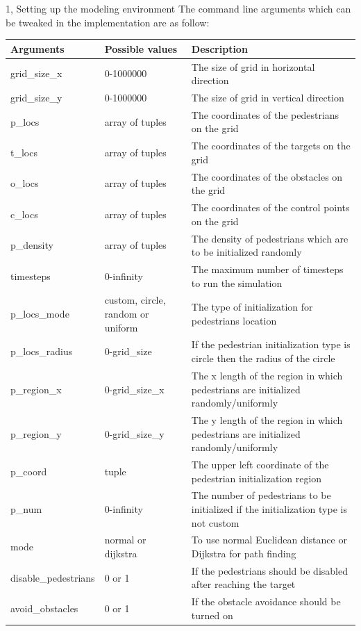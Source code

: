 \documentclass[10pt,a4paper]{article}
\begin{document}
\begin{task}{1, Setting up the modeling environment}
The command line arguments which can be tweaked in the implementation are as follow:
\begin{center}
\begin{tabular}{ | m{3cm} | m{3cm}| m{7cm} | } 
\hline
Arguments & Possible values & Description \\ 
\hline\hline
grid\_size\_x & 0-1000000 & The size of grid in horizontal direction \\ 
\hline
grid\_size\_y & 0-1000000 & The size of grid in vertical direction \\ 
\hline
p\_locs & array of tuples & The coordinates of the pedestrians on the grid  \\ 
\hline
t\_locs & array of tuples & The coordinates of the targets on the grid  \\ 
\hline
o\_locs & array of tuples & The coordinates of the obstacles on the grid  \\ 
\hline
c\_locs & array of tuples & The coordinates of the control points on the grid  \\ 
\hline
p\_density & array of tuples & The density of pedestrians which are to be initialized randomly  \\ 
\hline
timesteps & 0-infinity & The maximum number of timesteps to run the simulation  \\ 
\hline
p\_locs\_mode & custom, circle, random or uniform & The type of initialization for pedestrians location  \\ 
\hline
p\_locs\_radius & 0-grid\_size & If the pedestrian initialization type is circle then the radius of the circle  \\
\hline
p\_region\_x & 0-grid\_size\_x & The x length of the region in which pedestrians are initialized randomly/uniformly \\
\hline
p\_region\_y & 0-grid\_size\_y & The y length of the region in which pedestrians are initialized randomly/uniformly \\
\hline
p\_coord & tuple & The upper left coordinate of the pedestrian initialization region \\
\hline
p\_num & 0-infinity & The number of pedestrians to be initialized if the initialization type is not custom \\
\hline
mode & normal or dijkstra & To use normal Euclidean distance or Dijkstra for path finding \\
\hline
disable\_pedestrians & 0 or 1 & If the pedestrians should be disabled after reaching the target \\
\hline
avoid\_obstacles & 0 or 1 & If the obstacle avoidance should be turned on \\
\hline
\end{tabular}
\end{center}


\end{task}
\end{document}
